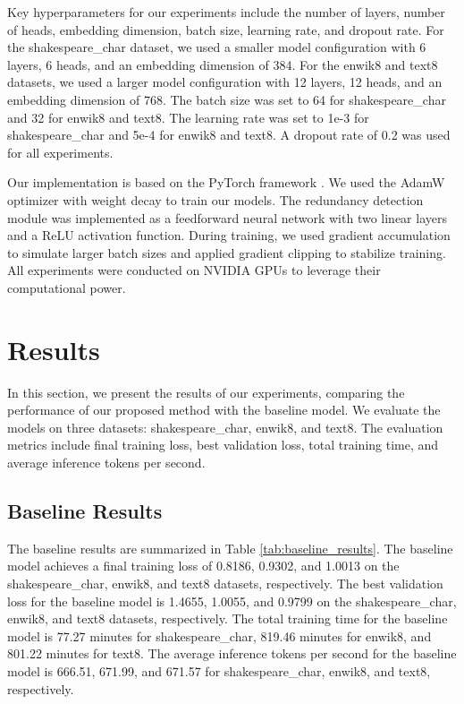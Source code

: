 \documentclass{article} %
\begin{document}
Key hyperparameters for our experiments include the number of layers, number of heads, embedding dimension, batch size, learning rate, and dropout rate. For the shakespeare\_char dataset, we used a smaller model configuration with 6 layers, 6 heads, and an embedding dimension of 384. For the enwik8 and text8 datasets, we used a larger model configuration with 12 layers, 12 heads, and an embedding dimension of 768. The batch size was set to 64 for shakespeare\_char and 32 for enwik8 and text8. The learning rate was set to 1e-3 for shakespeare\_char and 5e-4 for enwik8 and text8. A dropout rate of 0.2 was used for all experiments.

Our implementation is based on the PyTorch framework \citep{paszke2019pytorch}. We used the AdamW optimizer \citep{loshchilov2017adamw} with weight decay to train our models. The redundancy detection module was implemented as a feedforward neural network with two linear layers and a ReLU activation function. During training, we used gradient accumulation to simulate larger batch sizes and applied gradient clipping to stabilize training. All experiments were conducted on NVIDIA GPUs to leverage their computational power.

\section{Results}
\label{sec:results}

In this section, we present the results of our experiments, comparing the performance of our proposed method with the baseline model. We evaluate the models on three datasets: shakespeare\_char, enwik8, and text8. The evaluation metrics include final training loss, best validation loss, total training time, and average inference tokens per second.

\subsection{Baseline Results}

The baseline results are summarized in Table \ref{tab:baseline_results}. The baseline model achieves a final training loss of 0.8186, 0.9302, and 1.0013 on the shakespeare\_char, enwik8, and text8 datasets, respectively. The best validation loss for the baseline model is 1.4655, 1.0055, and 0.9799 on the shakespeare\_char, enwik8, and text8 datasets, respectively. The total training time for the baseline model is 77.27 minutes for shakespeare\_char, 819.46 minutes for enwik8, and 801.22 minutes for text8. The average inference tokens per second for the baseline model is 666.51, 671.99, and 671.57 for shakespeare\_char, enwik8, and text8, respectively.
\end{document}
